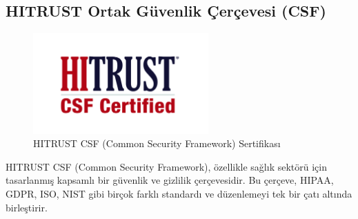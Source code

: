 \subsection{HITRUST Ortak Güvenlik Çerçevesi (CSF)}

\begin{figure}[H]
    \centering
    \includegraphics[width=0.6\textwidth]{img/HITRUSTCSFCertifiedLogo.png}
    \caption{HITRUST CSF (Common Security Framework) Sertifikası}
    \label{fig:hitrust-csf}
\end{figure}

HITRUST CSF (Common Security Framework), özellikle sağlık sektörü için tasarlanmış kapsamlı bir güvenlik ve gizlilik çerçevesidir. Bu çerçeve, HIPAA, GDPR, ISO, NIST gibi birçok farklı standardı ve düzenlemeyi tek bir çatı altında birleştirir.


